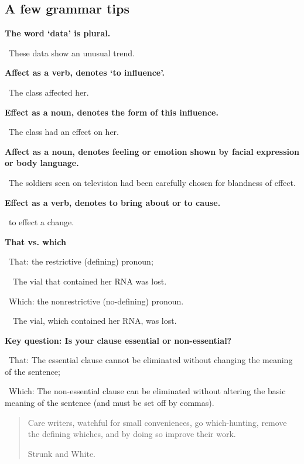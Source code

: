 \documentclass[a4paper, 12pt]{article}
\begin{document}
\newpage\subsection{A few grammar tips}

\textbf{The word `data' is plural.}
\par\textbullet\ These data show an unusual trend.

\textbf{Affect as a verb, denotes `to influence'.}
\par\textbullet\ The class affected her.

\textbf{Effect as a noun, denotes the form of this influence.}
\par\textbullet\ The class had an effect on her.

\textbf{Affect as a noun, denotes feeling or emotion shown by facial expression or body language.}
\par\textbullet\ The soldiers seen on television had been carefully chosen for blandness of effect.

\textbf{Effect as a verb, denotes to bring about or to cause.}
\par\textbullet\ to effect a change.

\textbf{That vs. which}
\par\textbullet\ That: the restrictive (defining) pronoun;
\par\ \textopenbullet\ The vial that contained her RNA was lost.
\par\textbullet\ Which: the nonrestrictive (no-defining) pronoun.
\par\ \textopenbullet\ The vial, which contained her RNA, was lost.

\textbf{Key question: Is your clause essential or non-essential?}
\par\textbullet\ That: The essential clause cannot be eliminated without changing the meaning of the sentence;
\par\textbullet\ Which: The non-essential clause can be eliminated without altering the basic meaning of the sentence (and must be set off by commas).

\vspace{4pt}\begin{quote}
Care writers, watchful for small conveniences, go which-hunting, remove the defining whiches, and by doing so improve their work.
\begin{flushright}
Strunk and White.
\end{flushright}
\end{quote}
\end{document}
